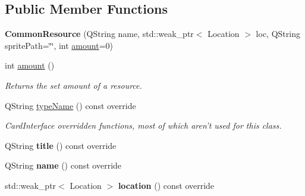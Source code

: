 \subsection*{Public Member Functions}
\begin{DoxyCompactItemize}
\item 
\hypertarget{class_interface_1_1_common_resource_a1b219e14bb85f9ed32848bba3f3acae5}{{\bfseries Common\-Resource} (Q\-String name, std\-::weak\-\_\-ptr$<$ Location $>$ loc, Q\-String sprite\-Path=\char`\"{}\char`\"{}, int \hyperlink{class_interface_1_1_common_resource_a80c78bd1ca1ffbf1281507e4b1fa7519}{amount}=0)}\label{class_interface_1_1_common_resource_a1b219e14bb85f9ed32848bba3f3acae5}

\item 
int \hyperlink{class_interface_1_1_common_resource_a80c78bd1ca1ffbf1281507e4b1fa7519}{amount} ()
\begin{DoxyCompactList}\small\item\em Returns the set amount of a resource. \end{DoxyCompactList}\item 
\hypertarget{class_interface_1_1_common_resource_add7d68536ba103eb0b76bfbaba3fb1a6}{Q\-String \hyperlink{class_interface_1_1_common_resource_add7d68536ba103eb0b76bfbaba3fb1a6}{type\-Name} () const override}\label{class_interface_1_1_common_resource_add7d68536ba103eb0b76bfbaba3fb1a6}

\begin{DoxyCompactList}\small\item\em Card\-Interface overridden functions, most of which aren't used for this class. \end{DoxyCompactList}\item 
\hypertarget{class_interface_1_1_common_resource_a4687234bc1162c7e52365ebf3d709b18}{Q\-String {\bfseries title} () const override}\label{class_interface_1_1_common_resource_a4687234bc1162c7e52365ebf3d709b18}

\item 
\hypertarget{class_interface_1_1_common_resource_af865b2e86d525307f1ae9d6d13f28723}{Q\-String {\bfseries name} () const override}\label{class_interface_1_1_common_resource_af865b2e86d525307f1ae9d6d13f28723}

\item 
\hypertarget{class_interface_1_1_common_resource_a5f95047d800f33707067ea14b40a07c6}{std\-::weak\-\_\-ptr$<$ Location $>$ {\bfseries location} () const override}\label{class_interface_1_1_common_resource_a5f95047d800f33707067ea14b40a07c6}


\end{DoxyCompactItemize}
